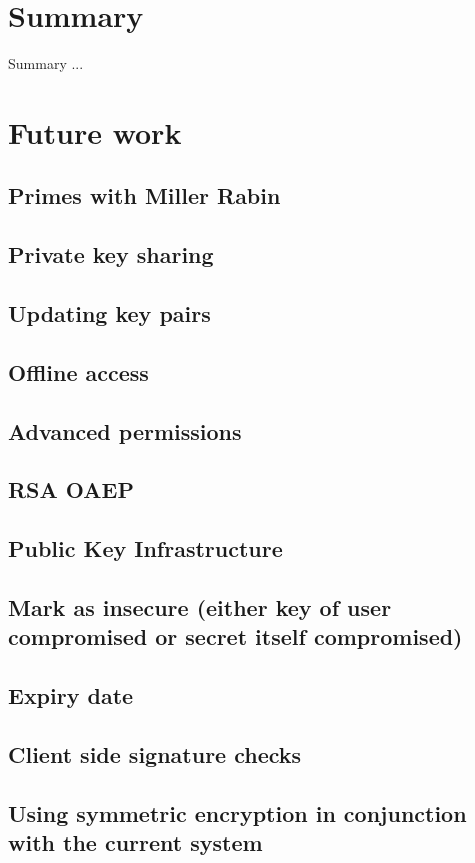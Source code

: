 \chapter{Summary}

Summary ...

\chapter{Future work}

\section{Primes with Miller Rabin}
\section{Private key sharing}
\section{Updating key pairs}
\section{Offline access}
\section{Advanced permissions}
\section{RSA OAEP}
\section{Public Key Infrastructure}
\section{Mark as insecure (either key of user compromised or secret itself compromised)}
\section{Expiry date}
\section{Client side signature checks}
\section{Using symmetric encryption in conjunction with the current system}
